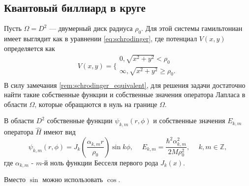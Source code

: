 \subsection{Квантовый биллиард в круге}\label{sec:ch1/sec2/sub1}
Пусть $\Omega = D^2$ --- двумерный диск радиуса $\rho_0$. Для этой системы гамильтониан имеет выглядит как в уравнении \eqref{eq:schrodinger}, где 
потенциал $V(x,y)$ определяется как
\[
    V(x, y) = 
    \Bigg\{
    \begin{array}{cc}
        0, \sqrt{x^2+y^2} < \rho_0 \\
        \infty, \sqrt{x^2+y^2} \geq \rho_0. \\
    \end{array}
\] 
В силу замечания \ref{rem:schrodinger_equivalent}, для решения задачи достаточно найти такие собственные функции и собственные значения оператора Лапласа в области $\Omega$, которые обращаются в нуль на границе $\Omega$.
\begin{statement}
В области $D^2$ собственные функции $\psi_{k, m}(r, \phi)$ и собственные значения $E_{k,m}$ оператора $\hat{H}$ имеют вид 
$$\psi_{k, m}(r, \phi) = J_k\left(\frac{\alpha_{k, m}r}{\rho_0}\right)\sin{k \phi}, \hspace{15pt} E_{k,m} = \frac{\hbar^2 \alpha_{k, m}^2}{2M\rho_0^2}, \hspace{15pt} k, m \in \mathbb{Z},$$
где $\alpha_{k, m}$ - $m$-й ноль функции Бесселя первого рода $J_k(x)$.
\label{st:sec1_stat1}
\end{statement}
\begin{remark}
Вместо $\sin$ можно использовать $\cos$.
\end{remark}
